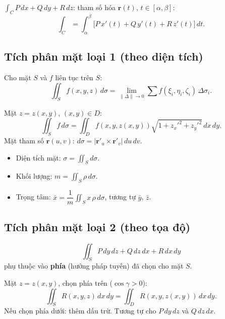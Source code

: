 \documentclass[12pt,a4paper]{article}
\begin{document}
\begin{congthuc}[title={Tích phân đường loại 2 trong không gian}]
  $\displaystyle\int_C P\,dx + Q\,dy + R\,dz$: tham số hóa $\mathbf{r}(t)$, $t \in [\alpha, \beta]$:
  \[
    \int_C = \int_\alpha^\beta \bigl[P\,x'(t) + Q\,y'(t) + R\,z'(t)\bigr]\,dt.
  \]
\end{congthuc}

\subsection{Tích phân mặt loại 1 (theo diện tích)}

\begin{dinhnghia}
  Cho mặt $S$ và $f$ liên tục trên $S$:
  \[
    \iint_S f(x,y,z)\,d\sigma = \lim_{\|\Delta\| \to 0} \sum f(\xi_i, \eta_i, \zeta_i)\,\Delta\sigma_i.
  \]
\end{dinhnghia}

\begin{congthuc}[title={Cách tính}]
  Mặt $z = z(x,y)$, $(x,y) \in D$:
  \[
    \iint_S f\,d\sigma = \iint_D f(x, y, z(x,y))\sqrt{1 + z_x'^2 + z_y'^2}\,dx\,dy.
  \]
  Mặt tham số $\mathbf{r}(u,v)$: $d\sigma = |\mathbf{r}'_u \times \mathbf{r}'_v|\,du\,dv$.
\end{congthuc}

\begin{congthuc}[title={Ứng dụng}]
  \begin{itemize}
    \item Diện tích mặt: $\sigma = \displaystyle\iint_S d\sigma$.
    \item Khối lượng: $m = \displaystyle\iint_S \rho\,d\sigma$.
    \item Trọng tâm: $\bar{x} = \dfrac{1}{m}\displaystyle\iint_S x\,\rho\,d\sigma$, tương tự $\bar{y}$, $\bar{z}$.
  \end{itemize}
\end{congthuc}

\subsection{Tích phân mặt loại 2 (theo tọa độ)}

\begin{dinhnghia}
  \[
    \iint_S P\,dy\,dz + Q\,dz\,dx + R\,dx\,dy
  \]
  phụ thuộc vào \textbf{phía} (hướng pháp tuyến) đã chọn cho mặt $S$.
\end{dinhnghia}

\begin{congthuc}[title={Cách tính}]
  Mặt $z = z(x,y)$, chọn phía trên ($\cos\gamma > 0$):
  \[
    \iint_S R(x,y,z)\,dx\,dy = \iint_D R(x, y, z(x,y))\,dx\,dy.
  \]
  Nếu chọn phía dưới: thêm dấu trừ. Tương tự cho $P\,dy\,dz$ và $Q\,dz\,dx$.
\end{congthuc}
\end{document}
